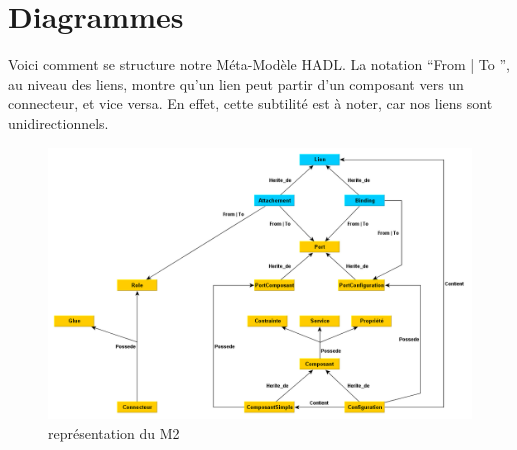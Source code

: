 \section{Diagrammes}

Voici comment se structure notre Méta-Modèle HADL. La notation ``From | To '',
au niveau des liens, montre qu'un lien peut partir d'un composant vers un
connecteur, et vice versa. En effet, cette subtilité est à noter, car nos liens
sont unidirectionnels.

	\begin{figure}[!h]
		\centering
		\includegraphics[scale=0.5]{../images/m2.PNG}
		\caption{représentation du M2}
	\end{figure}
		
\clearpage